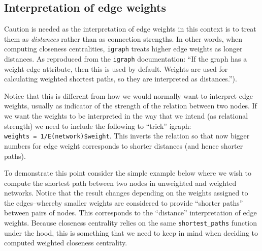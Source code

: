 \documentclass[
]{book}
\newenvironment{Shaded}{\begin{snugshade}}{\end{snugshade}}
\newcommand{\AttributeTok}[1]{\textcolor[rgb]{0.13,0.29,0.53}{#1}}
\newcommand{\CommentTok}[1]{\textcolor[rgb]{0.56,0.35,0.01}{\textit{#1}}}
\newcommand{\DecValTok}[1]{\textcolor[rgb]{0.00,0.00,0.81}{#1}}
\newcommand{\FunctionTok}[1]{\textcolor[rgb]{0.13,0.29,0.53}{\textbf{#1}}}
\newcommand{\NormalTok}[1]{#1}
\newcommand{\OtherTok}[1]{\textcolor[rgb]{0.56,0.35,0.01}{#1}}
\newcommand{\SpecialCharTok}[1]{\textcolor[rgb]{0.81,0.36,0.00}{\textbf{#1}}}
\begin{document}
\subsection{Interpretation of edge weights}\label{interpretation-of-edge-weights}

Caution is needed as the interpretation of edge weights in this context is to treat them as \emph{distances} rather than as connection strengths. In other words, when computing closeness centralities, \texttt{igraph} treats higher edge weights as longer distances. As reproduced from the \texttt{igraph} documentation: ``If the graph has a weight edge attribute, then this is used by default. Weights are used for calculating weighted shortest paths, so they are interpreted as distances.'').

Notice that this is different from how we would normally want to interpret edge weights, usually as indicator of the strength of the relation between two nodes. If we want the weights to be interpreted in the way that we intend (as relational strength) we need to include the following to ``trick'' igraph: \texttt{weights\ =\ 1/E(network)\$weight}. This inverts the relation so that now bigger numbers for edge weight corresponds to shorter distances (and hence shorter paths).

To demonstrate this point consider the simple example below where we wish to compute the shortest path between two nodes in unweighted and weighted networks. Notice that the result changes depending on the weights assigned to the edges--whereby smaller weights are considered to provide ``shorter paths'' between pairs of nodes. This corresponds to the ``distance'' interpretation of edge weights. Because closeness centrality relies on the same \texttt{shortest\_paths} function under the hood, this is something that we need to keep in mind when deciding to computed weighted closeness centrality.

\begin{Shaded}
\end{Shaded}
\end{document}
